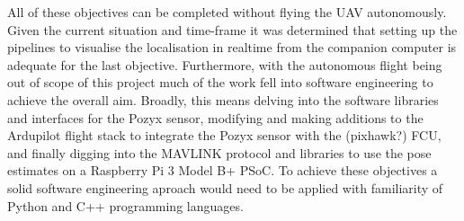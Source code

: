 All of these objectives can be completed without flying the UAV autonomously.
Given the current situation and time-frame it was determined that setting up the pipelines to visualise the localisation in realtime from the companion computer is adequate for the last objective.
Furthermore, with the autonomous flight being out of scope of this project much of the work fell into software engineering to achieve the overall aim.
Broadly, this means delving into the software libraries and interfaces for the Pozyx sensor, modifying and making additions to the Ardupilot flight stack to integrate the Pozyx sensor with the (pixhawk?) FCU,
and finally digging into the MAVLINK protocol and libraries to use the pose estimates on a Raspberry Pi 3 Model B+ PSoC.
To achieve these objectives a solid software engineering aproach would need to be applied with familiarity of Python and C++ programming languages.

